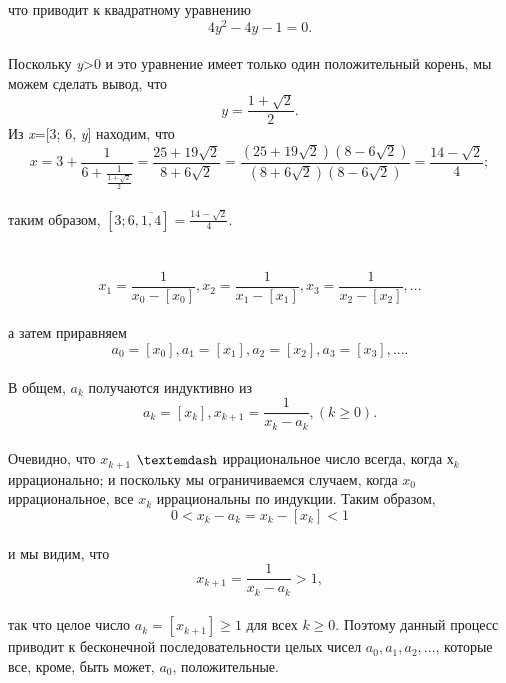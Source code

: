 \documentclass[a4paper,12pt]{article}
\renewcommand{\headrulewidth}{0pt}
\begin{document}
	что приводит к квадратному уравнению \\
	$$4y^2-4y-1=0.$$\\
	Поскольку \textit{y}>0 и это уравнение имеет только один положительный корень, мы можем сделать вывод, что\\
	$$\textit{y}=\frac{1+\sqrt{2}}{2}.$$
	\newpage
	\renewcommand{\headrulewidth}{0pt}
	\lhead{\textbf{\thepage}}
	\setcounter{page}{318}
	Из \textit{x}=[3; 6, \textit{y}] находим, что\\
	$$\textit{x}=3+\frac{1}{6+\frac{1}{\frac{1+\sqrt{2}}{2}}}=\frac{25+19\sqrt{2}}{8+6\sqrt{2}}=\frac{(25+19\sqrt{2})(8-6\sqrt{2})}{(8+6\sqrt{2})(8-6\sqrt{2})}=\frac{14-\sqrt{2}}{4};$$\\
	таким образом, $[3; 6, \overline{1, 4}]=\frac{14-\sqrt{2}}{4}.$\\\\
	\\
	$$\textit{$x_1$}=\frac{1}{\textit{$x_0$}-[\textit{$x_0$}]}, \textit{$x_2$}=\frac{1}{\textit{$x_1$}-[\textit{$x_1$}]}, \textit{$x_3$}=\frac{1}{\textit{$x_2$}-[\textit{$x_2$}]}, ...$$\\
	а затем приравняем\\
	$$a_0=[x_0], a_1=[x_1], a_2=[x_2], a_3=[x_3], ... .$$\\
	В общем, $a_k$ получаются индуктивно из\\
	$$a_k=[x_k], x_{k+1}=\frac{1}{x_k-a_k}, (k\geq0).$$\\
	Очевидно, что $x_{k+1}$ $\textemdash$ иррациональное число всегда, когда $х_k$ иррационально; и поскольку мы ограничиваемся случаем, когда $x_0$ иррациональное, все $x_k$ иррациональны по индукции. Таким образом,\\
	$$0<x_k-a_k=x_k-[x_k]<1$$\\
	и мы видим, что\\
	$$x_{k+1}=\frac{1}{x_k-a_k}>1,$$\\
	так что целое число $a_k=[x_{k+1}]\geq1$ для всех $k\geq$0. Поэтому данный процесс приводит к бесконечной последовательности целых чисел $a_0, a_1, a_2, ...$, которые все, кроме, быть может,  $a_0$, положительные.
\end{document}
